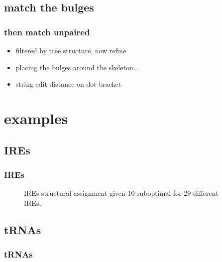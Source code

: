 \documentclass{beamer}
\begin{document}
\subsection{match the bulges}
\begin{frame}
	\frametitle{then match unpaired}
	\begin{figure}[!htb]
	\centering
	\resizebox{0.75\textwidth}{!}{}
	\end{figure}	
	\begin{itemize}
		\item filtered by tree structure, now refine
		\item placing the bulges around the skeleton...
		\item string edit distance on dot-bracket
	\end{itemize}
\end{frame}



\section{examples}
\subsection{IREs}
\begin{frame}
	\frametitle{IREs}
	\begin{figure}[!htb]
	\centering
	\resizebox{0.75\textwidth}{!}{}
	\caption{IREs structural assignment given 10 suboptimal for 29 different IREs.}
	\end{figure} 
\end{frame}



\subsection{tRNAs}
\begin{frame}
	\frametitle{tRNAs}
	

\end{frame}
\end{document}
